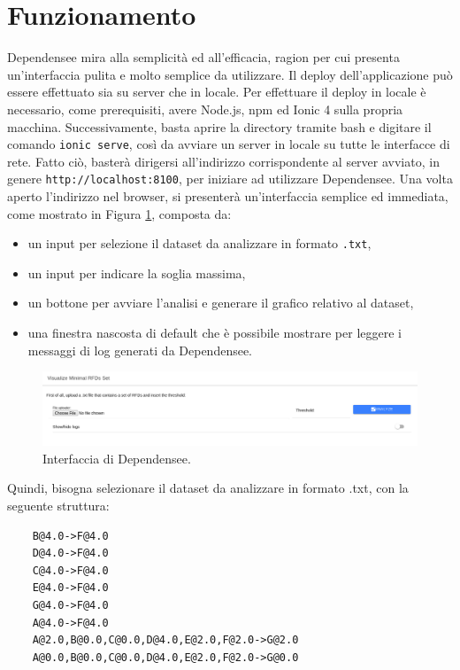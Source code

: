 \section{Funzionamento}
Dependensee mira alla semplicit\`{a} ed all'efficacia, ragion per cui presenta un'interfaccia pulita e molto semplice da utilizzare. Il deploy dell'applicazione pu\`{o} essere effettuato sia su server che in locale. Per effettuare il deploy in locale \`{e} necessario, come prerequisiti, avere Node.js, npm ed Ionic 4 sulla propria macchina. Successivamente, basta aprire la directory tramite bash e digitare il comando \texttt{ionic serve}, cos\`{i} da avviare un server in locale su tutte le interfacce di rete. Fatto ci\`{o}, baster\`{a} dirigersi all'indirizzo corrispondente al server avviato, in genere \texttt{http://localhost:8100}, per iniziare ad utilizzare Dependensee. Una volta aperto l'indirizzo nel browser, si presenter\`{a} un'interfaccia semplice ed immediata, come mostrato in Figura \ref{fig:dependensee_main_screen}, composta da:
\begin{itemize}
    \item un input per selezione il dataset da analizzare in formato \texttt{.txt},
    \item un input per indicare la soglia massima,
    \item un bottone per avviare l'analisi e generare il grafico relativo al dataset,
    \item una finestra nascosta di default che \`{e} possibile mostrare per leggere i messaggi di log generati da Dependensee.
\end{itemize}
\begin{figure}[ht]
    \centering
    \includegraphics[width=\linewidth]{capitoli/figure/dependensee_main_screen}
    \caption{Interfaccia di Dependensee.}
    \label{fig:dependensee_main_screen}
\end{figure}
Quindi, bisogna selezionare il dataset da analizzare in formato .txt, con la seguente struttura:
\begin{verbatim}
    B@4.0->F@4.0
    D@4.0->F@4.0
    C@4.0->F@4.0
    E@4.0->F@4.0
    G@4.0->F@4.0
    A@4.0->F@4.0
    A@2.0,B@0.0,C@0.0,D@4.0,E@2.0,F@2.0->G@2.0
    A@0.0,B@0.0,C@0.0,D@4.0,E@2.0,F@2.0->G@0.0
\end{verbatim}
